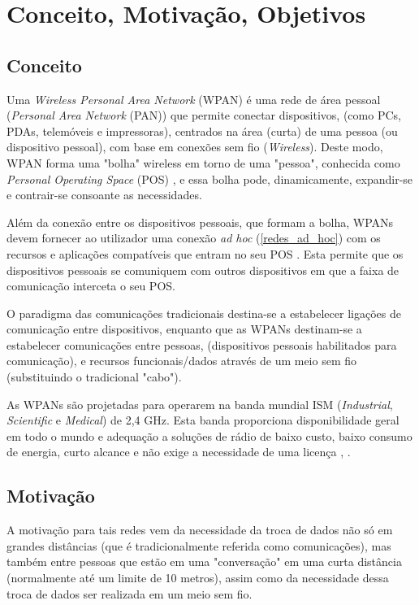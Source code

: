 \documentclass[conference]{IEEEtran}
\begin{document}
\section{Conceito, Motivação, Objetivos} \label{conc_mot_obj}

\subsection{Conceito}

Uma \textit{Wireless Personal Area Network} (WPAN) é uma rede de área pessoal (\textit{Personal Area Network} (PAN)) que permite conectar dispositivos, (como PCs, PDAs, telemóveis e impressoras), centrados na área (curta) de uma pessoa (ou dispositivo pessoal), com base em conexões sem fio (\textit{Wireless}). 
Deste modo, WPAN forma uma "bolha" wireless em torno de uma "pessoa", conhecida como \textit{Personal Operating Space} (POS) \cite{prasad2004ofdm}, e essa bolha pode, dinamicamente, expandir-se e contrair-se consoante as necessidades.

Além da conexão entre os dispositivos pessoais, que formam a bolha, WPANs devem fornecer ao utilizador uma conexão \textit{ad hoc} (\ref{redes_ad_hoc}) com os recursos e aplicações compatíveis que entram no seu POS \cite{prasad2004ofdm}.
Esta permite que os dispositivos pessoais se comuniquem com outros dispositivos em que a faixa de comunicação interceta o seu POS.

O paradigma das comunicações tradicionais destina-se a estabelecer ligações de comunicação entre dispositivos, enquanto que as WPANs destinam-se a estabelecer comunicações entre pessoas, (dispositivos pessoais habilitados para comunicação), e recursos funcionais/dados através de um meio sem fio (substituindo o tradicional "cabo").

As WPANs são projetadas para operarem na banda mundial ISM (\textit{Industrial}, \textit{Scientific} e \textit{Medical}) de 2,4 GHz. Esta banda proporciona disponibilidade geral em todo o mundo e adequação a soluções de rádio de baixo custo, baixo consumo de energia, curto alcance e não exige a necessidade de uma licença \cite{marsan2002optimizing}, \cite{braley2000wireless}.


\subsection{Motivação}

A motivação para tais redes vem da necessidade da troca de dados não só em grandes distâncias (que é tradicionalmente referida como comunicações), mas também entre pessoas que estão em uma "conversação" em uma curta distância (normalmente até um limite de 10 metros), assim como da necessidade dessa troca de dados ser realizada em um meio sem fio.
\end{document}
